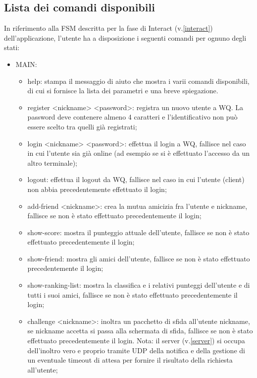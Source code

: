 \documentclass{article}
\begin{document}
    \subsection{Lista dei comandi disponibili}\label{client_commands}
    In riferimento alla FSM descritta per la fase di Interact (v.\ref{interact}) dell'applicazione, l'utente ha a disposizione i seguenti comandi per ognuno degli stati:
    \begin{itemize}
        \item MAIN:
        \begin{itemize}
            \item help: stampa il messaggio di aiuto che mostra i varii comandi disponibili, di cui si fornisce la lista dei parametri e una breve spiegazione.
            \item register <nickname> <password>: registra un nuovo utente a WQ. La password deve contenere almeno 4 caratteri e l'identificativo non può essere scelto tra quelli già registrati;
            \item login <nickname> <password>: effettua il login a WQ, fallisce nel caso in cui l'utente sia già online (ad esempio se si è effettuato l'accesso da un altro terminale);
            \item logout: effettua il logout da WQ, fallisce nel caso in cui l'utente (client) non abbia precedentemente effettuato il login;
            \item add-friend <nickname>: crea la mutua amicizia fra l'utente e nickname, fallisce se non è stato effettuato precedentemente il login;
            \item show-score: mostra il punteggio attuale dell'utente, fallisce se non è stato effettuato precedentemente il login;
            \item show-friend: mostra gli amici dell'utente, fallisce se non è stato effettuato precedentemente il login;
            \item show-ranking-list: mostra la classifica e i relativi punteggi dell'utente e di tutti i suoi amici, fallisce se non è stato effettuato precedentemente il login;
            \item challenge <nickname>: inoltra un pacchetto di sfida all'utente nickname, se nickname accetta si passa alla schermata di sfida, fallisce se non è stato effettuato precedentemente il login. Nota: il server (v.\ref{server}) si occupa dell'inoltro vero e proprio tramite UDP della notifica e della gestione di un eventuale timeout di attesa per fornire il risultato della richiesta all'utente;

\end{itemize}
\end{itemize}
\end{document}
